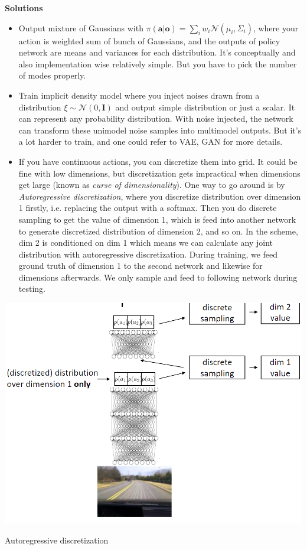 \documentclass[nobib]{tufte-handout}
\begin{document}
\noindent\textbf{Solutions}
\begin{itemize}
  \item Output mixture of Gaussians with $\pi(\mathbf{a} | \mathbf{o})= \sum_i w_i \mathcal{N}(\mu_i, \Sigma_i)$, where your action is weighted sum of bunch of Gaussians, and the outputs of policy network are means and variances for each distribution. It's conceptually and also implementation wise relatively simple. But you have to pick the number of modes properly.
  \item Train implicit density model where you inject noises drawn from a distribution $\xi \sim \mathcal{N}(0, \mathbf{I})$ and output simple distribution or just a scalar. It can represent any probability distribution. With noise injected, the network can transform these unimodel noise samples into multimodel outputs. But it's a lot harder to train, and one could refer to VAE, GAN for more details.
  \item If you have continuous actions, you can discretize them into grid. It could be fine with low dimensions, but discretization gets impractical when dimensions get large (known as \emph{curse of dimensionality}). One way to go around is by \emph{Autoregressive discretization}, where you discretize distribution over dimension 1 firstly, i.e. replacing the output with a softmax. Then you do discrete sampling to get the value of dimension 1, which is feed into another network to generate discretized distribution of dimension 2, and so on. In the scheme, dim 2 is conditioned on dim 1 which means we can calculate any joint distribution with autoregressive discretization. During training, we feed ground truth of dimension 1 to the second network and likewise for dimensions afterwards. We only sample and feed to following network during testing.
\end{itemize}

\begin{marginfigure}
  \centering
  \includegraphics[width=\linewidth]{discret}
  \caption{Autoregressive discretization}
  \label{fig:mix-gaussian}
\end{marginfigure}
\end{document}
